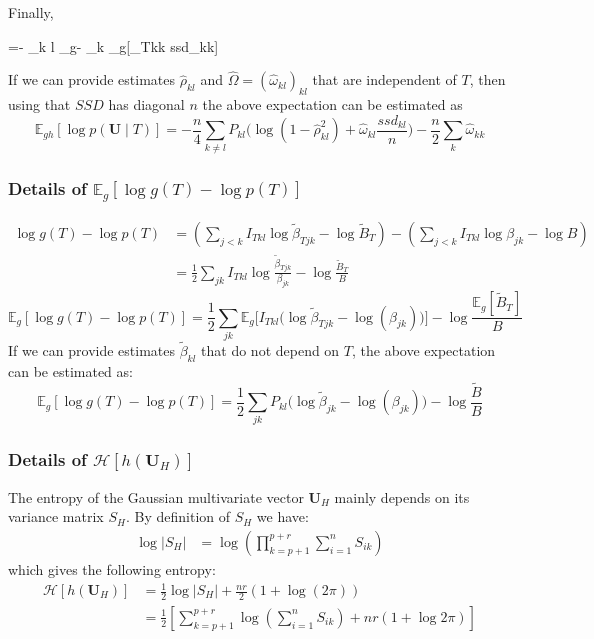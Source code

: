 \documentclass[11pt,a4paper]{article}
\newcommand*\lesswidefbox[1]{\fbox{\hspace{2em}#1\hspace{2em}}}
\newcommand{\entr}{\mathcal{H}}
\newcommand{\Ubf}{\boldsymbol{U}}
\newcommand{\Esp}{\mathds{E}}
\begin{document}
Finally, 
\begin{empheq}[box=\lesswidefbox]{align*}
\Esp_{gh} [\log p(\Ubf \mid T)] =-  \sum _{k \neq l} \Esp_g -  \sum_k \Esp_g[\omega_{Tkk} ssd_{kk}] 
 \end{empheq}
 If we can provide estimates $\hat{\rho}_{kl}$ and $\widehat{\Omega}=(\hat{\omega}_{kl})_{kl}$ that are independent of $T$, then using that $SSD$ has diagonal $n$ the above expectation can be estimated as
 $$\Esp_{gh} [\log p(\Ubf \mid T)] =-  \frac{n}{4}\sum _{k \neq l} P_{kl}\Big(\log(1-\hat{\rho}_{kl}^2)+ \hat{\omega}_{kl} \frac{ssd_{kl}}{n}\Big) -\frac{n}{2} \sum_{k} \hat{\omega}_{kk}$$
\subsubsection{Details of $\Esp_g[\log g(T) - \log p(T)]$}
\begin{align*}
\log g(T) - \log p(T) &= \left(  \sum_{j<k}I_{Tkl}\log \widetilde{\beta}_{Tjk} - \log \widetilde{B}_T\right) - \left(  \sum_{j<k} I_{Tkl}\log {\beta}_{jk} - \log {B}\right)\\
&=\frac{1}{2}\sum_{jk} I_{Tkl}\log \frac{\widetilde{\beta}_{Tjk}}{{\beta}_{jk}} - \log \frac{\widetilde{B}_T}{B}
\end{align*}
$$\boxed{
\Esp_g[\log g(T) - \log p(T)] = \frac{1}{2}\sum_{jk} \Esp_g\Big[I_{Tkl} \big(\log \widetilde{\beta}_{Tjk}-\log(\beta_{jk})\big)\Big] - \log \frac{\Esp_g[\widetilde{B}_T]}{B} }$$
If we can provide estimates $\widetilde{\beta}_{kl}$ that do not depend on $T$, the above expectation can be estimated as:
$$ \Esp_g[\log g(T) - \log p(T)] = \frac{1}{2}\sum_{jk} P_{kl} \big(\log \widetilde{\beta}_{jk}-\log(\beta_{jk})\big) - \log \frac{\widetilde{B}}{B} $$
 \subsubsection{Details of $\entr[h(\Ubf_H)]$}
 
 The entropy of the Gaussian multivariate vector $\Ubf_H$ mainly depends on its variance matrix $S_H$. By definition of $S_H$ we have:
 \begin{align*}
 \log |S_H| &= \log(\prod_{k=p+1}^{p+r} \sum_{i=1}^n S_{ik})
\end{align*}
which gives the following entropy:
\begin{align*}
\entr[h(\Ubf_H)]&= \frac{1}{2} \log |S_H| + \frac{nr}{2}(1+\log(2\pi))\\
 &=\frac{1}{2}\left[ \sum_{k=p+1}^{p+r} \log\left(\sum_{i=1}^n S_{ik}\right)+ nr(1+\log 2\pi )\right]
\end{align*}
\end{document}
